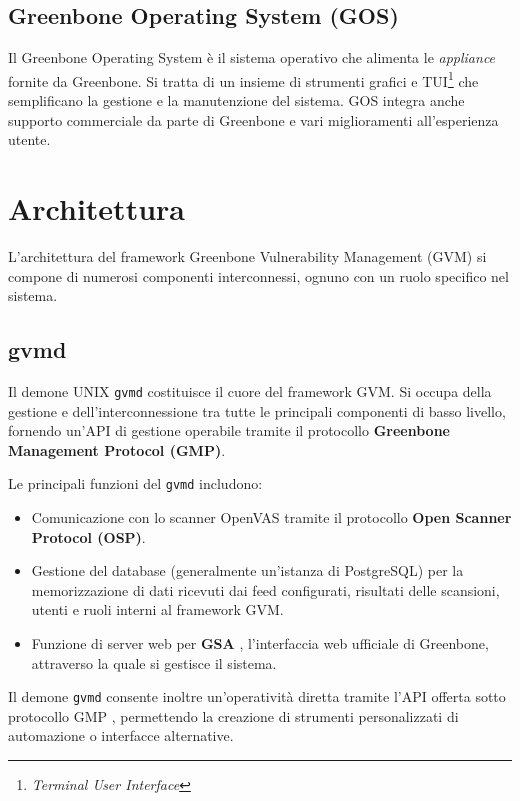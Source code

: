 \subsection{Greenbone Operating System (GOS)}
Il Greenbone Operating System è il sistema operativo che alimenta le \emph{appliance} fornite da Greenbone. Si tratta di un insieme di strumenti grafici e TUI\footnote{\emph{Terminal User Interface}} che semplificano la gestione e la manutenzione del sistema. GOS integra anche supporto commerciale da parte di Greenbone e vari miglioramenti all'esperienza utente.

\section{Architettura}
\label{greenbone-architecture}
L'architettura del framework Greenbone Vulnerability Management (GVM) si compone di numerosi componenti interconnessi, ognuno con un ruolo specifico nel sistema.

\subsection{gvmd}
Il demone UNIX \texttt{gvmd} \cite{gvmd} costituisce il cuore del framework GVM. Si occupa della gestione e dell'interconnessione tra tutte le principali componenti di basso livello, fornendo un'API di gestione operabile tramite il protocollo \textbf{Greenbone Management Protocol (GMP)}.
\label{gmp}

Le principali funzioni del \texttt{gvmd} includono:
\begin{itemize}
    \item Comunicazione con lo scanner OpenVAS tramite il protocollo \textbf{Open Scanner Protocol (OSP)}.
    \item Gestione del database (generalmente un'istanza di PostgreSQL) per la memorizzazione di dati ricevuti dai feed configurati, risultati delle scansioni, utenti e ruoli interni al framework GVM.
    \item Funzione di server web per \textbf{GSA} \cite{gsad}, l'interfaccia web ufficiale di Greenbone, attraverso la quale si gestisce il sistema.
\end{itemize}

Il demone \texttt{gvmd} consente inoltre un'operatività diretta tramite l'API offerta sotto protocollo GMP \cite{gmp}, permettendo la creazione di strumenti personalizzati di automazione o interfacce alternative.

